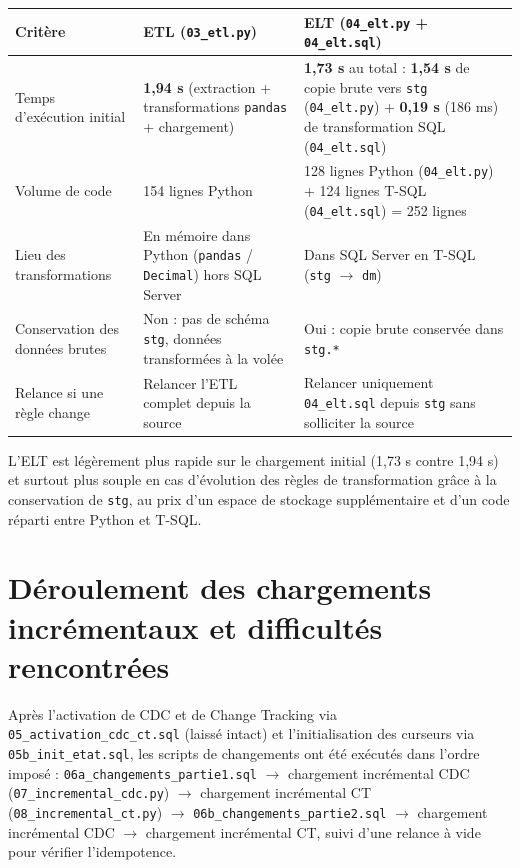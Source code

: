 \documentclass[9pt,a4paper]{article}
\begin{document}
\begingroup\small
\begin{tabularx}{\textwidth}{@{}>{\raggedright\arraybackslash}p{4.2cm}XX@{}}
\toprule
Critère & ETL (\texttt{03\_etl.py}) & ELT (\texttt{04\_elt.py} + \texttt{04\_elt.sql}) \\
\midrule
Temps d'exécution initial & \textbf{1,94 s} (extraction + transformations \texttt{pandas} + chargement) & \textbf{1,73 s} au total : \textbf{1,54 s} de copie brute vers \texttt{stg} (\texttt{04\_elt.py}) + \textbf{0,19 s} (186 ms) de transformation SQL (\texttt{04\_elt.sql}) \\
Volume de code & 154 lignes Python & 128 lignes Python (\texttt{04\_elt.py}) + 124 lignes T-SQL (\texttt{04\_elt.sql}) = 252 lignes \\
Lieu des transformations & En mémoire dans Python (\texttt{pandas} / \texttt{Decimal}) hors SQL Server & Dans SQL Server en T-SQL (\texttt{stg} $\rightarrow$ \texttt{dm}) \\
Conservation des données brutes & Non : pas de schéma \texttt{stg}, données transformées à la volée & Oui : copie brute conservée dans \texttt{stg.*} \\
Relance si une règle change & Relancer l'ETL complet depuis la source & Relancer uniquement \texttt{04\_elt.sql} depuis \texttt{stg} sans solliciter la source \\
\bottomrule
\end{tabularx}
\endgroup

L'ELT est légèrement plus rapide sur le chargement initial (1,73 s contre 1,94 s) et surtout plus souple en cas d'évolution des règles de transformation grâce à la conservation de \texttt{stg}, au prix d'un espace de stockage supplémentaire et d'un code réparti entre Python et T-SQL.

\section{Déroulement des chargements incrémentaux et difficultés rencontrées}

Après l'activation de CDC et de Change Tracking via \texttt{05\_activation\_cdc\_ct.sql} (laissé intact) et l'initialisation des curseurs via \texttt{05b\_init\_etat.sql}, les scripts de changements ont été exécutés dans l'ordre imposé : \texttt{06a\_changements\_partie1.sql} $\rightarrow$ chargement incrémental CDC (\texttt{07\_incremental\_cdc.py}) $\rightarrow$ chargement incrémental CT (\texttt{08\_incremental\_ct.py}) $\rightarrow$ \texttt{06b\_changements\_partie2.sql} $\rightarrow$ chargement incrémental CDC $\rightarrow$ chargement incrémental CT, suivi d'une relance à vide pour vérifier l'idempotence.
\end{document}

